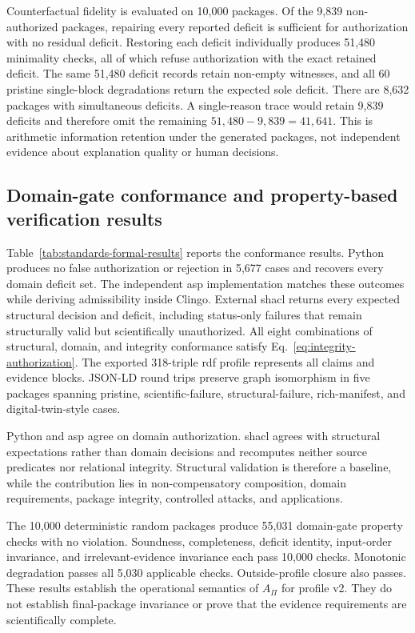 

Counterfactual fidelity is evaluated on 10,000 packages. Of the 9,839 non-authorized packages, repairing every reported deficit is sufficient for authorization with no residual deficit. Restoring each deficit individually produces 51,480 minimality checks, all of which refuse authorization with the exact retained deficit. The same 51,480 deficit records retain non-empty witnesses, and all 60 pristine single-block degradations return the expected sole deficit. There are 8,632 packages with simultaneous deficits. A single-reason trace would retain 9,839 deficits and therefore omit the remaining $51{,}480-9{,}839=41{,}641$. This is arithmetic information retention under the generated packages, not independent evidence about explanation quality or human decisions.

\subsection{Domain-gate conformance and property-based verification results}
\label{subsec:conformance-results}

Table~\ref{tab:standards-formal-results} reports the conformance results. Python produces no false authorization or rejection in 5,677 cases and recovers every domain deficit set. The independent \ac{asp} implementation matches these outcomes while deriving admissibility inside Clingo. External \ac{shacl} returns every expected structural decision and deficit, including status-only failures that remain structurally valid but scientifically unauthorized. All eight combinations of structural, domain, and integrity conformance satisfy Eq.~\ref{eq:integrity-authorization}. The exported 318-triple \ac{rdf} profile represents all claims and evidence blocks. JSON-LD round trips preserve graph isomorphism in five packages spanning pristine, scientific-failure, structural-failure, rich-manifest, and digital-twin-style cases.



Python and \ac{asp} agree on domain authorization. \ac{shacl} agrees with structural expectations rather than domain decisions and recomputes neither source predicates nor relational integrity. Structural validation is therefore a baseline, while the contribution lies in non-compensatory composition, domain requirements, package integrity, controlled attacks, and applications.

The 10,000 deterministic random packages produce 55,031 domain-gate property checks with no violation. Soundness, completeness, deficit identity, input-order invariance, and irrelevant-evidence invariance each pass 10,000 checks. Monotonic degradation passes all 5,030 applicable checks. Outside-profile closure also passes. These results establish the operational semantics of $A_{\Pi}$ for profile v2. They do not establish final-package invariance or prove that the evidence requirements are scientifically complete.

